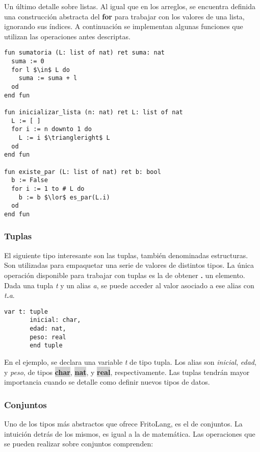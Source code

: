 \documentclass{article}
\newcommand{\Lang}{FritoLang} %
\newcommand{\type}[1]{\colorbox{lightgray}{\textbf{#1}}}
\begin{document}
Un último detalle sobre listas.
Al igual que en los arreglos, se encuentra definida una construcción abstracta del \textbf{for} para trabajar con los valores de una lista, ignorando sus índices.
A continuación se implementan algunas funciones que utilizan las operaciones antes descriptas.

\begin{lstlisting}
fun sumatoria (L: list of nat) ret suma: nat
  suma := 0
  for l $\in$ L do
    suma := suma + l
  od
end fun

fun inicializar_lista (n: nat) ret L: list of nat
  L := [ ]
  for i := n downto 1 do
    L := i $\triangleright$ L
  od
end fun

fun existe_par (L: list of nat) ret b: bool
  b := False
  for i := 1 to # L do
    b := b $\lor$ es_par(L.i)
  od
end fun
\end{lstlisting}

\subsubsection{Tuplas}
El siguiente tipo interesante son las tuplas, también denominadas estructuras.
Son utilizadas para empaquetar una serie de valores de distintos tipos.
La única operación disponible para trabajar con tuplas es la de obtener \textbf{.} un elemento.
Dada una tupla \textit{t} y un alias \textit{a}, se puede acceder al valor asociado a ese alias con \textit{t\textbf{.}a}.

\begin{lstlisting}
var t: tuple
       inicial: char,
       edad: nat,
       peso: real
       end tuple
\end{lstlisting}

En el ejemplo, se declara una variable \textit{t} de tipo tupla.
Los alias son \textit{inicial}, \textit{edad}, y \textit{peso}, de tipos \type{char}, \type{nat}, y \type{real}, respectivamente.
Las tuplas tendrán mayor importancia cuando se detalle como definir nuevos tipos de datos.

\subsubsection{Conjuntos}
Uno de los tipos más abstractos que ofrece \Lang, es el de conjuntos.
La intuición detrás de los mismos, es igual a la de matemática.
Las operaciones que se pueden realizar sobre conjuntos comprenden:
\end{document}
